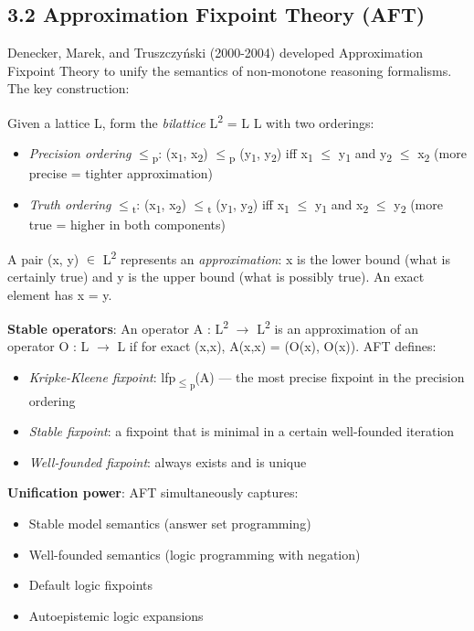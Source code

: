 \documentclass[11pt]{article}
\begin{document}
\subsection{3.2 Approximation Fixpoint Theory (AFT)}
\label{sec:orgb4e38ee}

Denecker, Marek, and Truszczyński (2000-2004) developed Approximation Fixpoint
Theory to unify the semantics of non-monotone reasoning formalisms. The key
construction:

Given a lattice L, form the \emph{bilattice} L\textsuperscript{2} = L \texttimes{} L with two orderings:
\begin{itemize}
\item \emph{Precision ordering} \(\le\)\textsubscript{p}: (x\textsubscript{1}, x\textsubscript{2}) \(\le\)\textsubscript{p} (y\textsubscript{1}, y\textsubscript{2}) iff x\textsubscript{1} \(\le\) y\textsubscript{1} and y\textsubscript{2} \(\le\) x\textsubscript{2}
(more precise = tighter approximation)
\item \emph{Truth ordering} \(\le\)\textsubscript{t}: (x\textsubscript{1}, x\textsubscript{2}) \(\le\)\textsubscript{t} (y\textsubscript{1}, y\textsubscript{2}) iff x\textsubscript{1} \(\le\) y\textsubscript{1} and x\textsubscript{2} \(\le\) y\textsubscript{2}
(more true = higher in both components)
\end{itemize}

A pair (x, y) \(\in\) L\textsuperscript{2} represents an \emph{approximation}: x is the lower bound
(what is certainly true) and y is the upper bound (what is possibly true). An
exact element has x = y.

\textbf{Stable operators}: An operator A : L\textsuperscript{2} \(\to\) L\textsuperscript{2} is an approximation of an
operator O : L \(\to\) L if for exact (x,x), A(x,x) = (O(x), O(x)). AFT defines:
\begin{itemize}
\item \emph{Kripke-Kleene fixpoint}: lfp\textsubscript{\(\le\)\textsubscript{p}}(A) --- the most precise fixpoint in the
precision ordering
\item \emph{Stable fixpoint}: a fixpoint that is minimal in a certain well-founded
iteration
\item \emph{Well-founded fixpoint}: always exists and is unique
\end{itemize}

\textbf{Unification power}: AFT simultaneously captures:
\begin{itemize}
\item Stable model semantics (answer set programming)
\item Well-founded semantics (logic programming with negation)
\item Default logic fixpoints
\item Autoepistemic logic expansions
\end{itemize}
\end{document}
